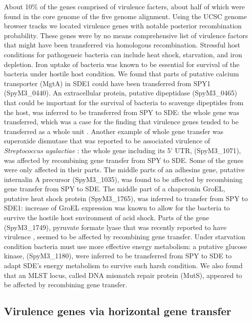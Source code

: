 \documentclass[english]{article}
\begin{document}
About 10\% of the genes comprised of virulence facters, about half of which were
found in the core genome of the five genome alignment. Using the UCSC genome
browser tracks we located virulence genes with notable posterior recombination
probability.  These genes were by no means comprehensive list of virulence
factors that might have been transferred via homologous recombination.
Stressful host conditions for pathogeneic bacteria can include heat shock,
starvation, and iron depletion.  Iron uptake of bacteria was known to be
essential for survival of the bacteria under hostile host condition. We found
that parts of putative calcium transporter (MgtA) in SDE1 could have been
transferred from SPY1 (SpyM3\_0440).  An extracellular protein, putative
dipeptidase (SpyM3\_0465) that could be important for the survival of bacteria
to scavenge dipeptides from the host, was inferred to be transferred from SPY to
SDE: the whole gene was transferred, which was a case for the finding that
virulence genes tended to be transferred as a whole unit \citep{Chan2009}.
Another example of whole gene transfer was superoxide dismutase that was
reported to be associated virulence of \textit{Streptococcus agalactiae}
\citep{Poyart2001}: the whole gene including its 5' UTR, (SpyM3\_1071), was
affected by recombining gene transfer from SPY to SDE.  Some of the genes were
only affected in their parts.  The middle parts of an adhesins gene, putative
internalin A precursor (SpyM3\_1035), was found to be affected by recombining
gene transfer from SPY to SDE.  The middle part of a chaperonin GroEL, putative
heat shock protein (SpyM3\_1765), was inferred to transfer from SPY to SDE1:
increase of GroEL expression was known to allow for the bacteria to survive the
hostile host environment of acid shock.  Parts of the gene (SpyM3\_1749),
pyruvate formate lyase that was recently reported to have virulence
\citep{Yesilkaya2009}, seemed to be affected by recombining gene transfer.
Under starvation condition bacteria must use more effective energy metabolism: a
putative glucose kinase, (SpyM3\_1180), were inferred to be transferred from SPY
to SDE to adapt SDE's energy metabolism to survive such harsh condition.  We
also found that an MLST locus, called DNA mismatch repair protein (MutS),
appeared to be affected by recombining gene transfer.  

\subsection{Virulence genes via horizontal gene transfer}
\end{document}
